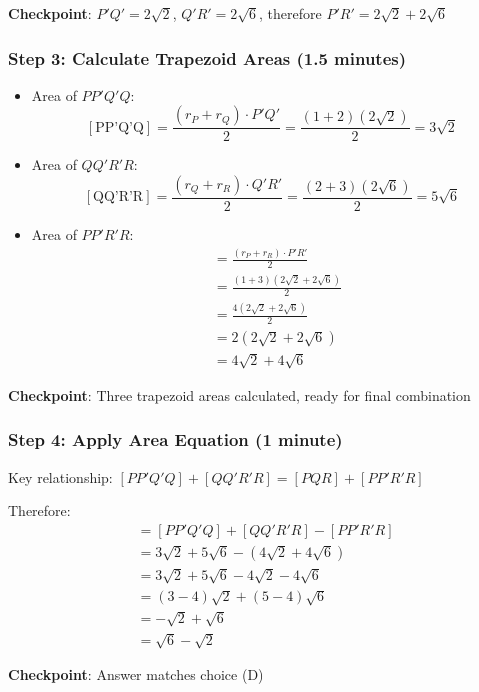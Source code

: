 \documentclass[]{article}
\begin{document}
\begin{solutionbox}
\textbf{Checkpoint}: $P'Q' = 2\sqrt{2}$, $Q'R' = 2\sqrt{6}$, therefore $P'R' = 2\sqrt{2} + 2\sqrt{6}$

\subsubsection*{Step 3: Calculate Trapezoid Areas (1.5 minutes)}
\begin{itemize}[leftmargin=*]
    \item Area of $PP'Q'Q$:
    \[[\text{PP'Q'Q}] = \frac{(r_P + r_Q) \cdot P'Q'}{2} = \frac{(1+2)(2\sqrt{2})}{2} = 3\sqrt{2}\]
    
    \item Area of $QQ'R'R$:
    \[[\text{QQ'R'R}] = \frac{(r_Q + r_R) \cdot Q'R'}{2} = \frac{(2+3)(2\sqrt{6})}{2} = 5\sqrt{6}\]
    
    \item Area of $PP'R'R$:
    \begin{align*}
    [\text{PP'R'R}] &= \frac{(r_P + r_R) \cdot P'R'}{2}\\
    &= \frac{(1+3)(2\sqrt{2}+2\sqrt{6})}{2}\\
    &= \frac{4(2\sqrt{2}+2\sqrt{6})}{2}\\
    &= 2(2\sqrt{2}+2\sqrt{6})\\
    &= 4\sqrt{2} + 4\sqrt{6}
    \end{align*}
\end{itemize}

\textbf{Checkpoint}: Three trapezoid areas calculated, ready for final combination

\subsubsection*{Step 4: Apply Area Equation (1 minute)}
Key relationship: $[PP'Q'Q] + [QQ'R'R] = [PQR] + [PP'R'R]$

Therefore:
\begin{align*}
[PQR] &= [PP'Q'Q] + [QQ'R'R] - [PP'R'R]\\
&= 3\sqrt{2} + 5\sqrt{6} - (4\sqrt{2} + 4\sqrt{6})\\
&= 3\sqrt{2} + 5\sqrt{6} - 4\sqrt{2} - 4\sqrt{6}\\
&= (3-4)\sqrt{2} + (5-4)\sqrt{6}\\
&= -\sqrt{2} + \sqrt{6}\\
&= \sqrt{6} - \sqrt{2}
\end{align*}

\textbf{Checkpoint}: Answer matches choice (D)


\end{solutionbox}
\end{document}
